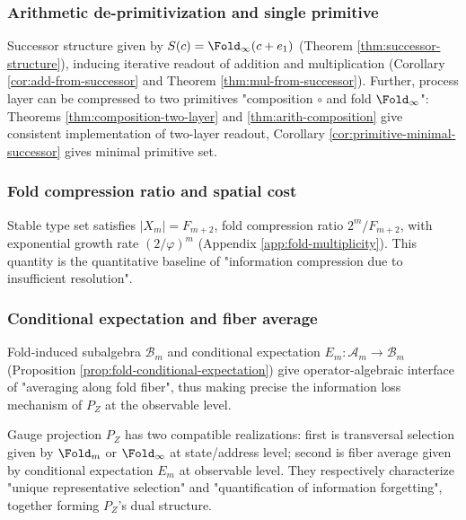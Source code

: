 \subsubsection{Arithmetic de-primitivization and single primitive}\label{subsec:pom-primitive-free}
Successor structure given by $S(c)=\Fold_\infty(c+e_1)$ (Theorem \ref{thm:successor-structure}), inducing iterative readout of addition and multiplication (Corollary \ref{cor:add-from-successor} and Theorem \ref{thm:mul-from-successor}). Further, process layer can be compressed to two primitives "composition $\circ$ and fold $\Fold_\infty$": Theorems \ref{thm:composition-two-layer} and \ref{thm:arith-composition} give consistent implementation of two-layer readout, Corollary \ref{cor:primitive-minimal-successor} gives minimal primitive set.

\subsubsection{Fold compression ratio and spatial cost}\label{subsec:pom-fold-compression}
Stable type set satisfies $|X_m|=F_{m+2}$, fold compression ratio $2^m/F_{m+2}$, with exponential growth rate $(2/\varphi)^m$ (Appendix \ref{app:fold-multiplicity}). This quantity is the quantitative baseline of "information compression due to insufficient resolution".

\subsubsection{Conditional expectation and fiber average}\label{subsec:pom-conditional-expectation}
Fold-induced subalgebra $\mathcal{B}_m$ and conditional expectation $E_m:\mathcal{A}_m\to\mathcal{B}_m$ (Proposition \ref{prop:fold-conditional-expectation}) give operator-algebraic interface of "averaging along fold fiber", thus making precise the information loss mechanism of $P_Z$ at the observable level.

\begin{remark}\label{rem:pom-pz-dual}
Gauge projection $P_Z$ has two compatible realizations: first is transversal selection given by $\Fold_m$ or $\Fold_\infty$ at state/address level; second is fiber average given by conditional expectation $E_m$ at observable level. They respectively characterize "unique representative selection" and "quantification of information forgetting", together forming $P_Z$'s dual structure.
\end{remark}

